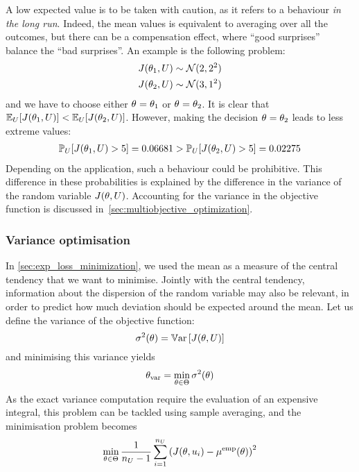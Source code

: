 \documentclass[../../Main_ManuscritThese.tex]{subfiles}
\begin{document}
A low expected value is to be taken with caution, as it refers to a
behaviour \emph{in the long run}. Indeed, the mean values is
equivalent to averaging over all the outcomes, but there can be a
compensation effect, where ``good surprises'' balance the ``bad
surprises''.  An example is the following problem:
\begin{align}
  J(\theta_1, U) &\sim \mathcal{N}(2, 2^2) \\
  J(\theta_2, U) & \sim \mathcal{N}(3, 1^2)
\end{align}
and we have to choose either ${\theta}_{\mathrm{}}=\theta_1$ or
${\theta}_{\mathrm{}} = \theta_2$.  It is clear that
$\mathbb{E}_{U}[J(\theta_1, U)] < \mathbb{E}_{U}[J(\theta_2, U)]$. However, making
the decision ${\theta}_{\mathrm{}} = \theta_2$ leads to less extreme values:
\begin{align}
  \mathbb{P}_{U}[J(\theta_1, U) > 5] = 0.06681> \mathbb{P}_{U}[J(\theta_2, U) > 5] = 0.02275
\end{align}
Depending on the application, such a behaviour could be prohibitive.
This difference in these probabilities is explained by the difference
in the variance of the random variable $J(\theta, U)$.  Accounting for
the variance in the objective function is discussed
in~\cref{sec:multiobjective_optimization}.

\subsubsection{Variance optimisation}
In \cref{sec:exp_loss_minimization}, we used the mean as a measure of
the central tendency that we want to minimise. Jointly with the
central tendency, information about the dispersion of the random
variable may also be relevant, in order to predict how much deviation
should be expected around the mean.  Let us define the variance of the
objective function:
\begin{equation}
  \sigma^2(\theta) = \mathbb{V}\mathrm{ar}\left[J(\theta,U)\right]
\end{equation}
and minimising this variance yields
\begin{equation}
  {\theta}_{\mathrm{var}} = \min_{\theta \in \Theta} \sigma^2(\theta)
\end{equation}
As the exact variance computation require the evaluation of an
expensive integral, this problem can be tackled using sample
averaging, and the minimisation problem becomes
\begin{equation}
  \min_{\theta\in \Theta} \frac{1}{n_{U}-1} \sum_{i=1}^{n_{U}} \left(J(\theta, u_i) - \mu^{\mathrm{emp}}(\theta)\right)^2
\end{equation}
\end{document}
